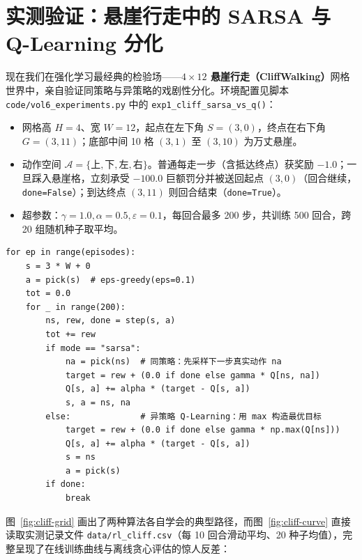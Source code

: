 \section{实测验证：悬崖行走中的 SARSA 与 Q-Learning 分化}
\label{sec:exp-cliff}

现在我们在强化学习最经典的检验场——\textbf{$4 \times 12$ 悬崖行走（CliffWalking）}网格世界中，亲自验证同策略与异策略的戏剧性分化。环境配置见脚本 \texttt{code/\allowbreak vol6\_experiments.py} 中的 \texttt{exp1\_cliff\_\allowbreak sarsa\_vs\_q()}：
\begin{itemize}
  \item 网格高 $H=4$、宽 $W=12$，起点在左下角 $S = (3, 0)$，终点在右下角 $G = (3, 11)$；底部中间 10 格 $(3, 1)$ 至 $(3, 10)$ 为万丈悬崖。
  \item 动作空间 $\mathcal{A} = \{\text{上}, \text{下}, \text{左}, \text{右}\}$。普通每走一步（含抵达终点）获奖励 $-1.0$；一旦踩入悬崖格，立刻承受 $-100.0$ 巨额罚分并被送回起点 $(3, 0)$（回合继续，\texttt{done=False}）；到达终点 $(3, 11)$ 则回合结束（\texttt{done=True}）。
  \item 超参数：$\gamma = 1.0, \alpha = 0.5, \varepsilon = 0.1$，每回合最多 200 步，共训练 500 回合，跨 20 组随机种子取平均。
\end{itemize}

\begin{lstlisting}[caption={SARSA 与 Q-Learning 在悬崖行走中的核心对比循环（摘自 \texttt{vol6\_experiments.py}）}]
for ep in range(episodes):
    s = 3 * W + 0
    a = pick(s)  # eps-greedy(eps=0.1)
    tot = 0.0
    for _ in range(200):
        ns, rew, done = step(s, a)
        tot += rew
        if mode == "sarsa":
            na = pick(ns)  # 同策略：先采样下一步真实动作 na
            target = rew + (0.0 if done else gamma * Q[ns, na])
            Q[s, a] += alpha * (target - Q[s, a])
            s, a = ns, na
        else:              # 异策略 Q-Learning：用 max 构造最优目标
            target = rew + (0.0 if done else gamma * np.max(Q[ns]))
            Q[s, a] += alpha * (target - Q[s, a])
            s = ns
            a = pick(s)
        if done:
            break
\end{lstlisting}

图~\ref{fig:cliff-grid} 画出了两种算法各自学会的典型路径，而图~\ref{fig:cliff-curve} 直接读取实测记录文件 \texttt{data/rl\_cliff.csv}（每 10 回合滑动平均、20 种子均值），完整呈现了在线训练曲线与离线贪心评估的惊人反差：

